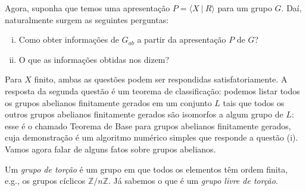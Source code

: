     	\par\vspace{0.3cm} Agora, suponha que temos uma apresentação $P = \langle X \ | \ R \rangle$ para um 
    	grupo $G$. Daí, naturalmente surgem as seguintes perguntas:
    	\begin{enumerate}[(i)]
    		\item Como obter informações de $G_{ab}$ a partir da apresentação $P$ de $G$?
    		\item O que as informações obtidas nos dizem? 
    	\end{enumerate}
    	Para $X$ finito, ambas as questões podem ser respondidas satisfatoriamente. 
    	A resposta da segunda questão é um teorema de classificação: podemos listar todos os grupos abelianos
    	finitamente gerados em um conjunto $L$ tais que todos os outros grupos abelianos finitamente gerados 
    	são isomorfos a algum grupo de $L$: esse é o chamado Teorema de Base para grupos abelianos finitamente
    	gerados, cuja demonstração é um algoritmo numérico simples que responde a questão (i). Vamos agora 
    	falar de alguns fatos sobre grupos abelianos.
    	
    	\par\vspace{0.3cm} Um \textit{grupo de torção} é um grupo em que todos os elementos têm ordem finita,
    	e.g., os grupos cíclicos $\mathbb{Z}/n\mathbb{Z}$. Já sabemos o que é um \textit{grupo livre de torção}.
    	

